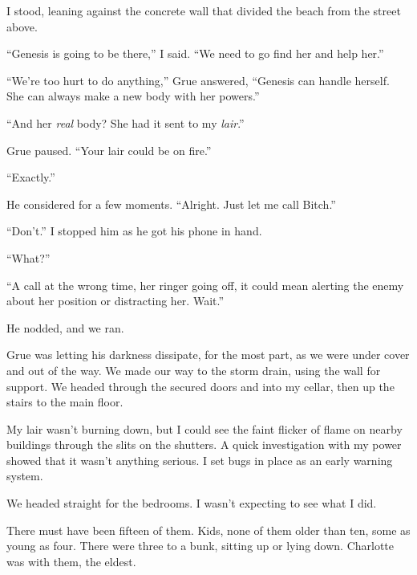 I stood, leaning against the concrete wall that divided the beach from the street above.



``Genesis is going to be there,'' I said.  ``We need to go find her and help her.''



``We're too hurt to do anything,'' Grue answered, ``Genesis can handle herself.  She can always make a new body with her powers.''



``And her \emph{real} body?  She had it sent to my \emph{lair}.''



Grue paused.  ``Your lair could be on fire.''



``Exactly.''



He considered for a few moments.  ``Alright.  Just let me call Bitch.''



``Don't.''  I stopped him as he got his phone in hand.



``What?''



``A call at the wrong time, her ringer going off, it could mean alerting the enemy about her position or distracting her.  Wait.''



He nodded, and we ran.



Grue was letting his darkness dissipate, for the most part, as we were under cover and out of the way.  We made our way to the storm drain, using the wall for support.  We headed through the secured doors and into my cellar, then up the stairs to the main floor.



My lair wasn't burning down, but I could see the faint flicker of flame on nearby buildings through the slits on the shutters.  A quick investigation with my power showed that it wasn't anything serious.  I set bugs in place as an early warning system.



We headed straight for the bedrooms.  I wasn't expecting to see what I did.



There must have been fifteen of them.  Kids, none of them older than ten, some as young as four.  There were three to a bunk, sitting up or lying down.  Charlotte was with them, the eldest.



